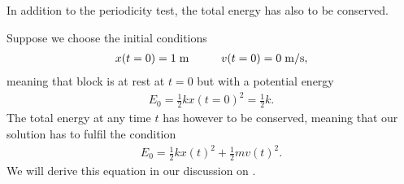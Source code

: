 \documentclass[letterpaper,10pt,english]{sphinxmanual}
\begin{document}
In addition to the periodicity test, the total energy has also to be conserved.

Suppose we choose the initial conditions
\begin{equation*}
\begin{split}
x(t=0)=1\hspace{0.1cm} \mathrm{m}\hspace{1cm} v(t=0)=0\hspace{0.1cm}\mathrm{m/s},
\end{split}
\end{equation*}
meaning that block is at rest at \(t=0\) but with a potential energy
\begin{equation*}
\begin{split}
E_0=\frac{1}{2}kx(t=0)^2=\frac{1}{2}k.
\end{split}
\end{equation*}
The total energy at any time \(t\) has however to be conserved, meaning that our solution has to fulfil the condition
\begin{equation*}
\begin{split}
E_0=\frac{1}{2}kx(t)^2+\frac{1}{2}mv(t)^2.
\end{split}
\end{equation*}
We will derive this equation in our discussion on .
\end{document}
